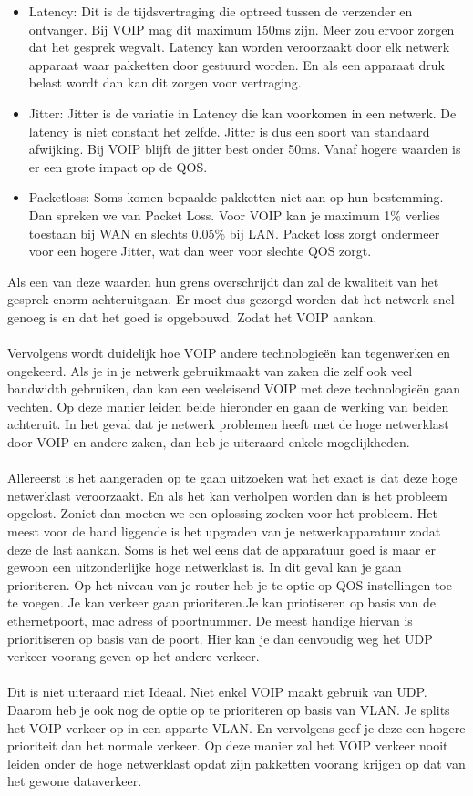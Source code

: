 \documentclass[pdftex,a4paper,12pt,twoside]{report}
\begin{document}
\begin{itemize}
	\item Latency: Dit is de tijdsvertraging die optreed tussen de verzender en ontvanger. Bij VOIP mag dit maximum 150ms zijn. Meer zou ervoor zorgen dat het gesprek wegvalt. Latency kan worden veroorzaakt door elk netwerk apparaat waar pakketten door gestuurd worden. En als een apparaat druk belast wordt dan kan dit zorgen voor vertraging.
	\item Jitter: Jitter is de variatie in Latency die kan voorkomen in een netwerk. De latency is niet constant het zelfde. Jitter is dus een soort van standaard afwijking. Bij VOIP blijft de jitter best onder 50ms. Vanaf hogere waarden is er een grote impact op de QOS.
	\item Packetloss: Soms komen bepaalde pakketten niet aan op hun bestemming. Dan spreken we van Packet Loss. Voor VOIP kan je  maximum 1\% verlies toestaan bij WAN en slechts 0.05\% bij LAN. Packet loss zorgt ondermeer voor een hogere Jitter, wat dan weer voor slechte QOS zorgt. 
\end{itemize}
Als een van deze waarden hun grens overschrijdt dan zal de kwaliteit van het gesprek enorm achteruitgaan. Er moet dus gezorgd worden dat het netwerk snel genoeg is en dat het goed is opgebouwd. Zodat het VOIP aankan. \\ \\
Vervolgens wordt duidelijk hoe VOIP andere technologieën kan tegenwerken en ongekeerd. Als je in je netwerk gebruikmaakt van zaken die zelf ook veel bandwidth gebruiken, dan kan een veeleisend VOIP met deze technologieën gaan vechten. Op deze manier leiden beide hieronder en gaan de werking van beiden achteruit. In het geval dat je netwerk problemen heeft met de hoge netwerklast door VOIP en andere zaken, dan heb je uiteraard enkele mogelijkheden. 
\\ \\
Allereerst is het aangeraden op te gaan uitzoeken wat het exact is dat deze hoge netwerklast veroorzaakt. En als het kan verholpen worden dan is het probleem opgelost. Zoniet dan moeten we een oplossing zoeken voor het probleem.  Het meest voor de hand liggende is het upgraden van je netwerkapparatuur zodat deze de last aankan. Soms is het wel eens dat de apparatuur goed is maar er gewoon een uitzonderlijke hoge netwerklast is. In dit geval kan je gaan prioriteren. Op het niveau van je router heb je te optie op QOS instellingen toe te voegen. Je kan verkeer gaan prioriteren.Je kan priotiseren op basis van de ethernetpoort, mac adress of poortnummer. De meest handige hiervan is prioritiseren op basis van de poort. Hier kan je dan eenvoudig weg het UDP verkeer voorang geven op het andere verkeer.\\ \\
Dit is niet uiteraard niet Ideaal. Niet enkel VOIP maakt gebruik van UDP. Daarom heb je ook nog de optie op te prioriteren op basis van VLAN. Je splits het VOIP verkeer op in een apparte VLAN. En vervolgens geef je deze een hogere prioriteit dan het normale verkeer. Op deze manier zal het VOIP verkeer nooit leiden onder de hoge netwerklast opdat zijn pakketten voorang krijgen op dat van het gewone dataverkeer.
\end{document}
